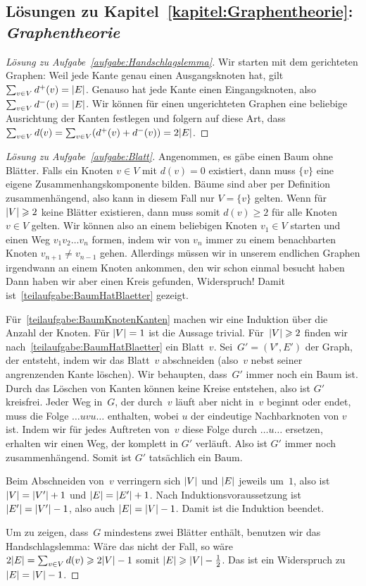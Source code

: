 
\subsection*{Lösungen zu Kapitel~\ref{kapitel:Graphentheorie}: \emph{Graphentheorie}}
\begin{proof}[Lösung zu Aufgabe~\ref{aufgabe:Handschlagslemma}]
	Wir starten mit dem gerichteten Graphen: Weil jede Kante genau einen Ausgangsknoten hat, gilt $\sum_{v\in V}d^+(v)=\abs{E}$. Genauso hat jede Kante einen Eingangsknoten, also $\sum_{v\in V}d^-(v)=\abs{E}$. Wir können für einen ungerichteten Graphen eine beliebige Ausrichtung der Kanten festlegen und folgern auf diese Art, dass $\sum_{v\in V}d(v)=\sum_{v\in V}\parens*{d^+(v)+d^-(v)}=2\abs{E}$.
\end{proof}
\begin{proof}[Lösung zu Aufgabe~\ref{aufgabe:Blatt}]
	Angenommen, es gäbe einen Baum ohne Blätter. Falls ein Knoten $v\in V$ mit $d(v)=0$ existiert, dann muss $\{v\}$ eine eigene Zusammenhangskomponente bilden. Bäume sind aber per Definition zusammenhängend, also kann in diesem Fall nur $V=\{v\}$ gelten. Wenn für $\abs*{V}\geqslant 2$ keine Blätter existieren, dann muss somit $d(v)\geqslant 2$ für alle Knoten $v\in V$ gelten. Wir können also an einem beliebigen Knoten $v_1\in V$ starten und einen Weg $v_1v_2\dots v_n$ formen, indem wir von $v_n$ immer zu einem benachbarten Knoten $v_{n+1}\neq v_{n-1}$ gehen. Allerdings müssen wir in unserem endlichen Graphen irgendwann an einem Knoten ankommen, den wir schon einmal besucht haben Dann haben wir aber einen Kreis gefunden, Widerspruch! Damit ist~\ref{teilaufgabe:BaumHatBlaetter} gezeigt.
	
	Für~\ref{teilaufgabe:BaumKnotenKanten} machen wir eine Induktion über die Anzahl der Knoten. Für $\abs*{V}=1$ ist die Aussage trivial. Für~$\abs*{V}\geqslant 2$ finden wir nach~\ref{teilaufgabe:BaumHatBlaetter} ein Blatt~$v$. Sei~$G'=(V',E')$ der Graph, der entsteht, indem wir das Blatt~$v$ abschneiden (also~$v$ nebst seiner angrenzenden Kante löschen). Wir behaupten, dass~$G'$ immer noch ein Baum ist. Durch das Löschen von Kanten können keine Kreise entstehen, also ist $G'$ kreisfrei. Jeder Weg in~$G$, der durch~$v$ läuft aber nicht in~$v$ beginnt oder endet, muss die Folge $\ldots uvu\ldots$ enthalten, wobei $u$ der eindeutige Nachbarknoten von $v$ ist. Indem wir für jedes Auftreten von~$v$ diese Folge durch $\ldots u\ldots $ ersetzen, erhalten wir einen Weg, der komplett in $G'$ verläuft. Also ist $G'$ immer noch zusammenhängend. Somit ist $G'$ tatsächlich ein Baum.
	
	Beim Abschneiden von~$v$ verringern sich $\abs*{V}$ und $\abs{E}$ jeweils um~$1$, also ist $\abs*{V}=\abs{V'}+1$ und $\abs*{E}=\abs{E'}+1$. Nach Induktionsvoraussetzung ist $\abs{E'}=\abs{V'}-1$, also auch $\abs*{E}=\abs{V}-1$. Damit ist die Induktion beendet.
	
	Um zu zeigen, dass~$G$ mindestens zwei Blätter enthält, benutzen wir das Handschlagslemma: Wäre das nicht der Fall, so wäre $2\abs*{E}=\sum_{v\in V}d(v)\geqslant 2\abs*{V}-1$ somit $\abs*{E}\geqslant \abs*{V}-\frac12$. Das ist ein Widerspruch zu $\abs*{E}=\abs*{V}-1$.
\end{proof}
